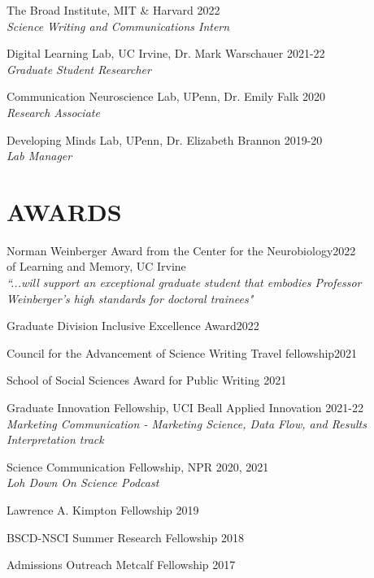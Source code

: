 \documentclass[margin, 10pt]{res} %
\begin{document}
\begin{resume}
{The Broad Institute, MIT \& Harvard} \hfill 2022 \\
{\sl Science Writing and Communications Intern}

{Digital Learning Lab, UC Irvine, Dr. Mark Warschauer} \hfill 2021-22 \\
{\sl Graduate Student Researcher}

{Communication Neuroscience Lab, UPenn, Dr. Emily Falk} \hfill 2020 \\
{\sl Research Associate}

{Developing Minds Lab, UPenn, Dr. Elizabeth Brannon} \hfill 2019-20 \\
{\sl Lab Manager}


 
\section{AWARDS}
{Norman Weinberger Award from the Center for the Neurobiology}\hfill 2022\\
{of Learning and Memory, UC Irvine}\\
{\sl ``...will support an exceptional graduate student that embodies Professor Weinberger's high standards for doctoral trainees"}

{Graduate Division Inclusive Excellence Award}\hfill 2022

{Council for the Advancement of Science Writing Travel fellowship}\hfill 2021

{School of Social Sciences Award for Public Writing} \hfill 2021

{Graduate Innovation Fellowship, UCI Beall Applied Innovation} \hfill 2021-22 \\
{\sl Marketing Communication - Marketing
Science, Data Flow, and Results \\Interpretation track}

{Science Communication Fellowship, NPR} \hfill 2020, 2021 \\
{\sl Loh Down On Science Podcast}

{Lawrence A. Kimpton Fellowship} \hfill 2019 

{BSCD-NSCI Summer Research Fellowship} \hfill 2018 

{Admissions Outreach Metcalf Fellowship} \hfill 2017 

 

\end{resume}
\end{document}
